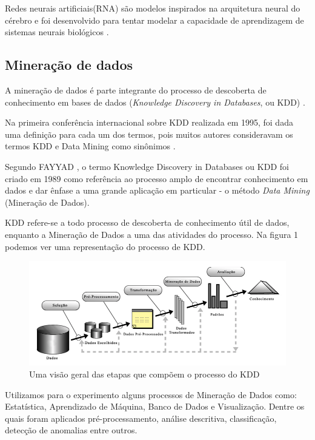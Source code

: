 \documentclass[conference]{IEEEtran}
\begin{document}
    Redes neurais artificiais(RNA) são modelos inspirados na arquitetura neural do cérebro e foi desenvolvido para tentar modelar a capacidade de aprendizagem de sistemas neurais biológicos \cite{b4}. 
	
	\subsection{Mineração de dados}
	
	A mineração de dados é parte integrante do processo de descoberta de conhecimento em bases de dados (\textit{Knowledge Discovery in Databases}, ou KDD) \cite{mineracao_nunes}.
	
	Na primeira  conferência internacional sobre KDD realizada em 1995, foi dada uma definição para cada um dos termos, pois muitos autores consideravam os termos KDD e Data Mining como sinônimos \cite{mineracao_nunes}. 
    
    Segundo FAYYAD \cite{kdd}, o termo Knowledge Discovery in Databases ou KDD foi criado em 1989 como referência ao processo amplo de encontrar conhecimento em dados e dar ênfase a uma grande aplicação em particular - o método \textit{Data Mining }(Mineração de Dados).
    
    KDD refere-se a todo processo de descoberta de conhecimento útil de dados, enquanto a Mineração de Dados a uma das atividades do processo. Na figura 1 podemos ver uma representação do processo de KDD.
   
	\begin{figure}[htbp]
	\centerline{\includegraphics[scale=0.3]{imagens/kdd.png}}
	\caption{Uma visão geral das etapas que compõem o processo do KDD}
	
	\label{fig}
	\end{figure}

    Utilizamos para o experimento alguns processos de Mineração de Dados como: Estatística, Aprendizado de Máquina, Banco de Dados e Visualização. Dentre os quais foram aplicados pré-processamento, análise descritiva, classificação, detecção de anomalias entre outros.
\end{document}
